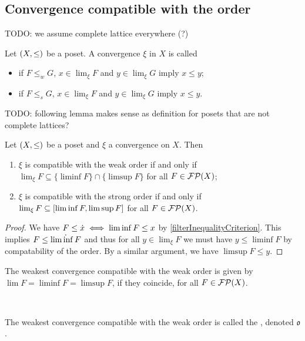 \subsection{Convergence compatible with the order}
TODO: we assume complete lattice everywhere (?)
\begin{definition}
Let $\left( X,\leq \right)$ be a poset. A convergence $\xi$ in $X$ is called
\begin{itemize}
\item {} if $F \leq_w G$, $x\in\lim_\xi F$ and $y\in \lim_\xi G$ imply $x\leq y$;
\item {} if $F \leq_s G$, $x\in\lim_\xi F$ and $y\in \lim_\xi G$ imply $x\leq y$.
\end{itemize}
\end{definition}
TODO: following lemma makes sense as definition for posets that are not complete lattices?

\begin{lemma}
Let $\left( X,\leq \right)$ be a poset and $\xi$ a convergence on $X$. Then
\begin{enumerate}
\item $\xi$ is compatible with the weak order \textup{if and only if} $\lim_\xi F\subseteq \{\liminf F\}\cap\{\limsup F\}$ for all $F\in\operatorname{\mathcal{FP}}(X)$;
\item $\xi$ is compatible with the strong order \textup{if and only if} $\lim_\xi F\subseteq \interval{\liminf F, \limsup F}$ for all $F\in\operatorname{\mathcal{FP}}(X)$.
\end{enumerate}
\end{lemma}
\begin{proof}
We have $F \leq \dot{x} \iff \liminf F \leq x$ by \ref{filterInequalityCriterion}. This implies 
$F \leq \dot{\liminf F}$ and thus for all $y\in\lim_\xi F$ we must have $y\leq \liminf F$ by compatability of the order. By a similar argument, we have $\limsup F \leq y$.
\end{proof}
\begin{corollary}
The weakest convergence compatible with the weak order is given by $\lim F = \liminf F =\limsup F$, if they coincide, for all $F\in \operatorname{\mathcal{FP}}(X)$.
\end{corollary}\

\begin{definition}
The weakest convergence compatible with the weak order is called the , denoted $\mathfrak{o}$.
\end{definition}

